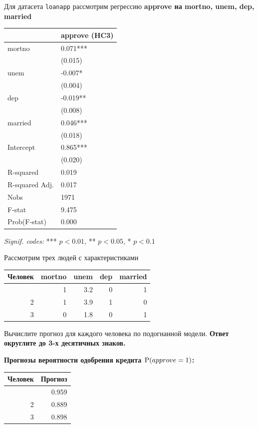 \documentclass[
  russian,
]{article}
\newcounter{none} %
\begin{document}
Для датасета \texttt{loanapp} рассмотрим регрессию \textbf{approve на
mortno, unem, dep, married}

{\def\LTcaptype{none} %
\begin{longtable}[]{@{}ll@{}}
\toprule\noalign{}
& approve (HC3) \\
\midrule\noalign{}
\endhead
\bottomrule\noalign{}
\endlastfoot
mortno & 0.071*** \\
& (0.015) \\
unem & -0.007* \\
& (0.004) \\
dep & -0.019** \\
& (0.008) \\
married & 0.046*** \\
& (0.018) \\
Intercept & 0.865*** \\
& (0.020) \\
R-squared & 0.019 \\
R-squared Adj. & 0.017 \\
Nobs & 1971 \\
F-stat & 9.475 \\
Prob(F-stat) & 0.000 \\
\end{longtable}
}

\emph{Signif. codes:} *** \(p<0.01\), ** \(p<0.05\), * \(p<0.1\)

Рассмотрим трех людей с характеристиками

{\def\LTcaptype{none} %
\begin{longtable}[]{@{}rrrrr@{}}
\toprule\noalign{}
Человек & mortno & unem & dep & married \\
\midrule\noalign{}
\endhead
\bottomrule\noalign{}
\endlastfoot
1 & 1 & 3.2 & 0 & 1 \\
2 & 1 & 3.9 & 1 & 0 \\
3 & 0 & 1.8 & 0 & 1 \\
\end{longtable}
}

Вычислите прогноз для каждого человека по подогнанной модели.
\textbf{Ответ округлите до 3-х десятичных знаков.}

\textbf{Прогнозы вероятности одобрения кредита
\({\textrm P}(approve=1)\):}

{\def\LTcaptype{none} %
\begin{longtable}[]{@{}rr@{}}
\toprule\noalign{}
Человек & Прогноз \\
\midrule\noalign{}
\endhead
\bottomrule\noalign{}
\endlastfoot
1 & 0.959 \\
2 & 0.889 \\
3 & 0.898 \\
\end{longtable}
}
\end{document}
